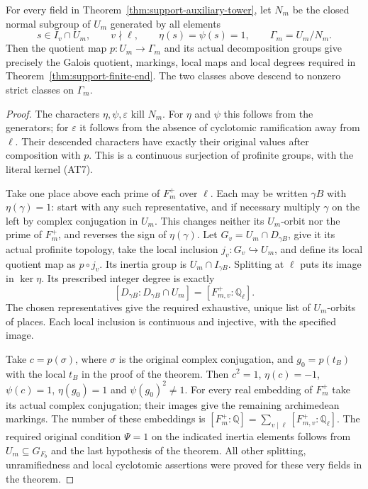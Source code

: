 \begin{corollary}
\label{cor:support-auxiliary-galois-quotient}
For every field in Theorem~\ref{thm:support-auxiliary-tower},
let $N_m$ be the closed normal subgroup of $U_m$ generated
by all elements
\[
 s\in I_v\cap U_m,\qquad v\nmid\ell,\qquad
                   \eta(s)=\psi(s)=1,
 \qquad \Gamma_m=U_m/N_m.                                \tag{AT7}
\]
Then the quotient map $p:U_m\to\Gamma_m$ and its actual
decomposition groups give precisely the Galois quotient,
markings, local maps and local degrees required in
Theorem~\ref{thm:support-finite-end}.  The two classes above
descend to nonzero strict classes on $\Gamma_m$.
\end{corollary}

\begin{proof}
The characters $\eta,\psi,\varepsilon$ kill $N_m$.
For $\eta$ and $\psi$ this follows from the generators; for
$\varepsilon$ it follows from the absence of cyclotomic
ramification away from $\ell$.  Their descended characters
have exactly their original values after composition with
$p$.  This is a continuous surjection of profinite groups,
with the literal kernel (AT7).

Take one place above each prime of $F_m^+$ over $\ell$.
Each may be written $\gamma B$ with $\eta(\gamma)=1$:
start with any such representative, and if necessary
multiply $\gamma$ on the left by complex conjugation in
$U_m$.  This changes neither its $U_m$-orbit nor the
prime of $F_m^+$, and reverses the sign of $\eta(\gamma)$.
Let $G_v=U_m\cap D_{\gamma B}$, give it its actual profinite
topology, take the local inclusion $j_v:G_v\hookrightarrow U_m$,
and define its local quotient map as $p\circ j_v$.  Its
inertia group is $U_m\cap I_{\gamma B}$.  Splitting at
$\ell$ puts its image in $\ker\eta$.  Its prescribed
integer degree is exactly
\[
 [D_{\gamma B}:D_{\gamma B}\cap U_m]
                         =[F_{m,v}^+:\mathbb Q_\ell].    \tag{AT8}
\]
The chosen representatives give the required exhaustive,
unique list of $U_m$-orbits of places.  Each local inclusion
is continuous and injective, with the specified image.

Take $c=p(\sigma)$, where $\sigma$ is the original complex
conjugation, and $g_0=p(t_B)$ with the local $t_B$ in the
proof of the theorem.  Then $c^2=1$, $\eta(c)=-1$,
$\psi(c)=1$, $\eta(g_0)=1$ and $\psi(g_0)^2\ne1$.
For every real embedding of $F_m^+$ take its actual
complex conjugation; their images give the remaining
archimedean markings.  The number of these embeddings is
$[F_m^+:\mathbb Q]=\sum_{v\mid\ell}[F_{m,v}^+:\mathbb Q_\ell]$.
The required original condition $\Psi=1$ on the indicated
inertia elements follows from $U_m\subseteq G_{F_b}$ and
the last hypothesis of the theorem.  All other splitting,
unramifiedness and local cyclotomic assertions were proved
for these very fields in the theorem.


\end{proof}

